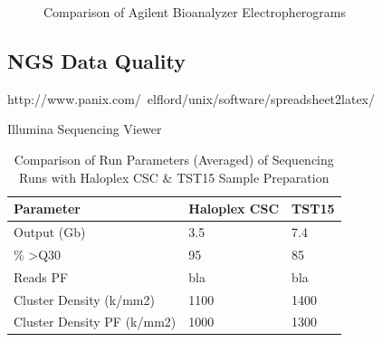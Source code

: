 \begin{figure}[!tbp]
  \centering
  \hfill
  \caption{Comparison of Agilent Bioanalyzer Electropherograms}
\end{figure}

\subsection{NGS Data Quality}

http://www.panix.com/~elflord/unix/software/spreadsheet2latex/

Illumina Sequencing Viewer

\begin{table}[!htbp]
    \caption[ISV]{Comparison of Run Parameters (Averaged) of Sequencing Runs with Haloplex CSC \& TST15 Sample Preparation}
    \centering
    \begin{tabular}{ |p{4cm}||p{4cm}||p{4cm}|}
    \hline
    Parameter & Haloplex CSC & TST15 \\ \hline \hline
    Output (Gb) & 3.5 & 7.4 \\ \hline
    \% \textgreater Q30 & 95 & 85 \\ \hline
    Reads PF & bla & bla \\ \hline
    Cluster Density (k/mm2) & 1100 & 1400 \\ \hline
    Cluster Density PF (k/mm2) & 1000 & 1300  \\ \hline
  \end{tabular}
\end{table}


